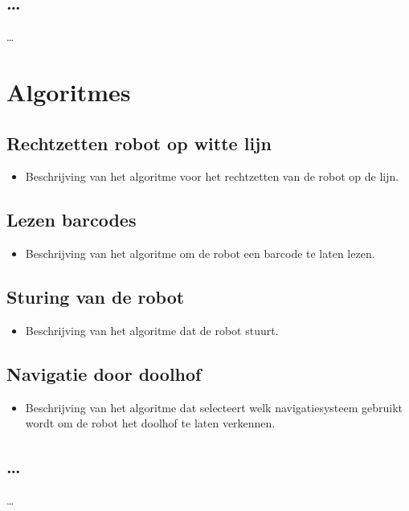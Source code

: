 \documentclass[tt1]{penoverslag}
\begin{document}
\subsection{\ldots}
\ldots


\section{Algoritmes}
\lipsum[4]

\subsection{Rechtzetten robot op witte lijn}
\begin{itemize}
\item Beschrijving van het algoritme voor het rechtzetten van de robot op de lijn.
\end{itemize}

\subsection{Lezen barcodes}
\begin{itemize}
\item Beschrijving van het algoritme om de robot een barcode te laten lezen.
\end{itemize}

\subsection{Sturing van de robot}
\begin{itemize}
\item Beschrijving van het algoritme dat de robot stuurt.
\end{itemize}

\subsection{Navigatie door doolhof}
\begin{itemize}
\item Beschrijving van het algoritme dat selecteert welk navigatiesysteem gebruikt wordt om de robot het doolhof te laten verkennen.
\end{itemize}

\subsection{\ldots}
\ldots
\end{document}
